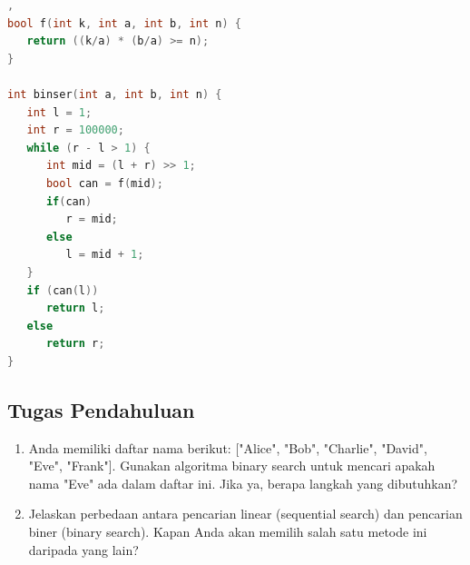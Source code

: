 \begin{lstlisting}[language=c,caption=Implementasi Binary Search],   
bool f(int k, int a, int b, int n) {
   return ((k/a) * (b/a) >= n);
}

int binser(int a, int b, int n) {
   int l = 1;
   int r = 100000;
   while (r - l > 1) {
      int mid = (l + r) >> 1;
      bool can = f(mid);
      if(can)
         r = mid;
      else
         l = mid + 1;
   }
   if (can(l))
      return l;
   else
      return r;
}
\end{lstlisting}

\subsection{Tugas Pendahuluan}
\begin{enumerate}
    \item Anda memiliki daftar nama berikut: ["Alice", "Bob", "Charlie", "David", "Eve", "Frank"]. 
    Gunakan algoritma binary search untuk mencari apakah nama "Eve" ada dalam daftar ini. 
    Jika ya, berapa langkah yang dibutuhkan?
    \item Jelaskan perbedaan antara pencarian linear (sequential search) dan pencarian biner (binary search).
     Kapan Anda akan memilih salah satu metode ini daripada yang lain?
\end{enumerate}

